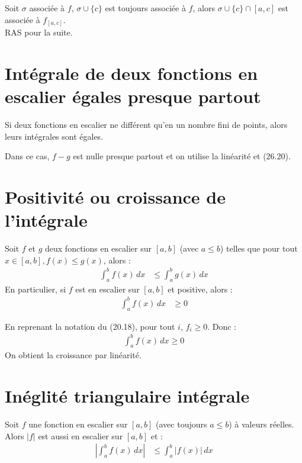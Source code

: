 \documentclass[../main.tex]{subfiles}
\begin{document}
\noindent Soit $\sigma$ associée à $f$, $\sigma \cup \{c\}$ est toujours associée à $f$, alors $\sigma \cup \{c\} \cap [a, c]$ est associée à $f_{[a,c]}$. \\
RAS pour la suite. 

\section{Intégrale de deux fonctions en escalier égales presque partout}
\begin{tcolorbox}[title=Propostion 26.23, title filled=false, colframe=lightblue, colback=lightblue!10!white]
    Si deux fonctions en escalier ne différent qu'en un nombre fini de points, alors leurs intégrales sont égales.
\end{tcolorbox}

\noindent Dans ce cas, $f-g$ est nulle presque partout et on utilise la linéarité et (26.20). 

\section{Positivité ou croissance de l'intégrale}
\begin{tcolorbox}[title=Propostion 26.24, title filled=false, colframe=lightblue, colback=lightblue!10!white]
    Soit $f$ et $g$ deux fonctions en escalier sur $[a,b]$ (avec $a\leq b$) telles que pour tout $x\in [a, b], f(x) \leq g(x)$, alors : 
    \begin{align*}
        \int_{a}^{b} f(x) \,dx &\leq \int_{a}^{b} g(x) \,dx
    \end{align*}
    En particulier, si $f$ est en escalier sur $[a,b]$ et positive, alors :
    \begin{align*}
        \int_{a}^{b} f(x) \,dx &\geq 0
    \end{align*}
\end{tcolorbox}

\noindent En reprenant la notation du (20.18), pour tout $i$, $f_i \geq 0$. Donc : 
\begin{align*}
    \int_{a}^{b} f(x) \,dx \geq 0
\end{align*}
On obtient la croissance par linéarité. 

\section{Inéglité triangulaire intégrale}
\begin{tcolorbox}[title=Propostion 26.26, title filled=false, colframe=lightblue, colback=lightblue!10!white]
    Soit $f$ une fonction en escalier sur $[a,b]$ (avec toujours $a\leq b$) à valeurs réelles. Alors $|f|$ est aussi en escalier sur $[a,b]$ et :
    \begin{align*}
        \left|\int_{a}^{b} f(x) \,dx \right| &\leq \int_{a}^{b} |f(x)| \,dx
    \end{align*}
\end{tcolorbox}
\end{document}
